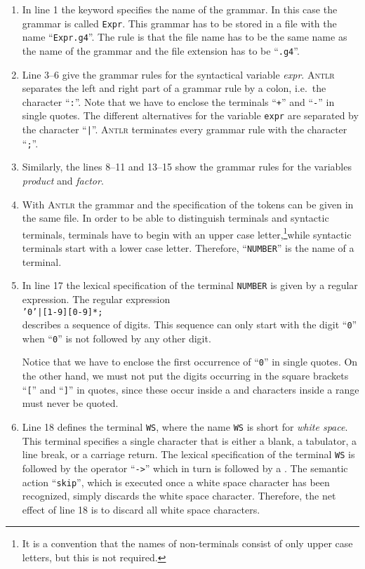 \begin{enumerate}
\item In line 1 the keyword  specifies the name of the grammar.
      In this case the grammar is called \texttt{Expr}.  This grammar has to be stored in a file with the name 
      ``\texttt{Expr.g4}''.  The rule is that the file name has to be the same name as the name of the grammar
      and the file extension has to be ``\texttt{.g4}''.  
\item Line 3--6 give the grammar rules for the syntactical variable \textsl{expr}.
      \textsc{Antlr} separates the left and right part of a grammar rule by a
      colon, i.e.~the character ``\texttt{:}''.  Note that we have to enclose the 
      terminals ``\texttt{+}'' and ``\texttt{-}'' in single quotes.  The different alternatives for the variable
      \texttt{expr} are separated by the character ``\texttt{|}''.
      \textsc{Antlr} terminates every grammar rule with the character ``\texttt{;}''.
\item Similarly, the lines 8--11 and 13--15 show the grammar rules for the variables \textsl{product} and
      \textsl{factor}.   
\item With \textsc{Antlr} the grammar and the specification of the tokens can be given in the same file.
      In order to be able to distinguish terminals and syntactic terminals, terminals have to begin with an upper case 
      letter,\footnote
      {It is a convention that the names of non-terminals consist of only upper case letters, but this is not
        required.}while syntactic terminals start with a lower case letter.   Therefore, ``\texttt{NUMBER}'' is the name
      of a terminal.
\item In line 17 the lexical specification of the terminal \texttt{NUMBER} is given
      by a regular expression.  The regular expression
      \\[0.2cm]
      \hspace*{1.3cm}
      \texttt{'0'|[1-9][0-9]*;}
      \\[0.2cm]
      describes a sequence of digits.  This sequence can only start with the digit
      ``\texttt{0}'' when ``\texttt{0}'' is not followed by any other digit.

      Notice that we have to enclose the first occurrence of ``\texttt{0}'' in single quotes.
      On the other hand, we must not put the digits occurring in the square brackets ``\texttt{[}'' 
      and ``\texttt{]}'' in quotes, since these occur inside a  and characters inside a range
      must never be quoted.
\item Line 18 defines the terminal \texttt{WS}, where the name \texttt{WS} is short for \emph{white space}. This terminal
      specifies a single character that is either a blank, a tabulator, a line break, or a carriage return.
      The lexical specification of the terminal \texttt{WS} is followed by the operator ``\texttt{->}'' 
      which in turn is followed by a .
      The semantic action ``\texttt{skip}'', which is executed once a white space character has been recognized, 
      simply discards the white space character.  Therefore, the net effect of line 18 is to discard all white
      space characters. 


\end{enumerate}
